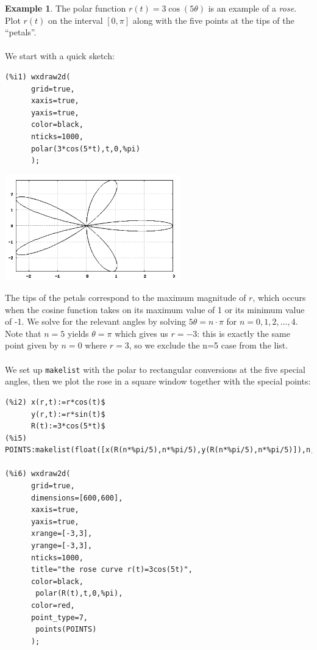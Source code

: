 \documentclass[10.5pt,twoside]{report}
\theoremstyle{definition}
\newtheorem{exmp}{Example}[section]
\begin{document}
\begin{exmp} The polar function $r(t)=3\cos{(5\theta)}$ is an example of a \textit{rose}.  Plot $r(t)$ on the interval $[0,\pi]$ along with the five points at the tips of the ``petals''.\\
${}$\\
We start with a quick sketch:

\begin{verbatim}
(%i1) wxdraw2d(
      grid=true,
      xaxis=true,
      yaxis=true,
      color=black,
      nticks=1000,
      polar(3*cos(5*t),t,0,%pi)
      ); 
\end{verbatim}

\includegraphics[width=3in]{example_5_3_5_1}

The tips of the petals correspond to the maximum magnitude of $r$,  which occurs when the cosine function takes on its maximum value of 1 or its minimum value of -1.  We solve for the relevant angles by solving $5\theta = n\cdot \pi$ for $n=0,1,2,\dots,4$.  Note that $n=5$ yields $\theta=\pi$ which gives us $r=-3$:  this is exactly the same point given by $n=0$ where $r=3$, so we exclude the n=5 case from the list. \\
${}$\\
We set up \verb|makelist| with the polar to rectangular conversions at the five special angles, then we plot the rose in a square window together with the special points: \\

\begin{verbatim}
(%i2) x(r,t):=r*cos(t)$
      y(r,t):=r*sin(t)$
      R(t):=3*cos(5*t)$
(%i5) POINTS:makelist(float([x(R(n*%pi/5),n*%pi/5),y(R(n*%pi/5),n*%pi/5)]),n,0,4)$

(%i6) wxdraw2d(
      grid=true,
      dimensions=[600,600],
      xaxis=true,
      yaxis=true,
      xrange=[-3,3],
      yrange=[-3,3],
      nticks=1000,
      title="the rose curve r(t)=3cos(5t)",
      color=black,
       polar(R(t),t,0,%pi),
      color=red,
      point_type=7,
       points(POINTS)
      );
\end{verbatim}



\end{exmp}
\end{document}

